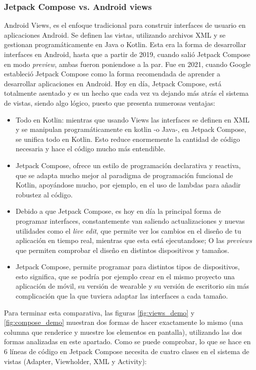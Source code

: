 \subsubsection{Jetpack Compose vs. Android views}
Android Views, es el enfoque tradicional para construir interfaces de usuario en aplicaciones Android. Se definen las vistas,  utilizando archivos XML y se gestionan programáticamente en Java o Kotlin. Esta era la forma de desarrollar interfaces en Android, hasta que a partir de 2019, cuando salió Jetpack Compose en modo \textit{preview}, ambas fueron poniendose a la par. Fue en 2021, cuando Google estableció Jetpack Compose como la forma recomendada de aprender a desarrollar aplicaciones en Android. Hoy en día, Jetpack Compose, está totalmente asentado y es un hecho que cada vez va dejando más atrás el sistema de vistas, siendo algo lógico, puesto que presenta numerosas ventajas:
\begin{itemize}
    \item Todo en Kotlin: mientras que usando Views las interfaces se definen en XML y se manipulan programáticamente en kotlin -o Java-, en Jetpack Compose, se unifica todo en Kotlin. Esto reduce enormemente la cantidad de código necesaria y hace el código mucho más entendible.
    \item Jetpack Compose, ofrece un estilo de programación declarativa y reactiva, que se adapta mucho mejor al paradigma de programación funcional de Kotlin, apoyándose mucho, por ejemplo, en el uso de 
	lambdas\hyperlink{cap:biblio}{} para añadir robustez al código.
    \item Debido a que Jetpack Compose, es hoy en día la principal forma de programar interfaces, constantemente van saliendo actualizaciones y nuevas utilidades como el \textit{live edit}, que permite ver los cambios en el diseño de tu aplicación en tiempo real, mientras que esta está ejecutandose; O las \textit{previews} que permiten comprobar el diseño en distintos dispositivos y tamaños.
    \item Jetpack Compose, permite programar para distintos tipos de dispositivos, esto significa, que se podría por ejemplo crear en el mismo proyecto una aplicación de móvil, su versión de wearable y su versión de escritorio sin más complicación que la que tuviera adaptar las interfaces a cada tamaño.
\end{itemize}
Para terminar esta comparativa, las figuras \ref{fig:views_demo}\hyperlink{cap:biblio}{} y \ref{fig:compose_demo} muestran dos formas de hacer exactamente lo mismo (una columna que renderice y muestre los elementos en pantalla), utilizando las dos formas analizadas en este apartado. Como se puede comprobar, lo que se hace en 6 líneas de código en Jetpack Compose necesita de cuatro clases en el sistema de vistas (Adapter, Viewholder, XML y Activity):
